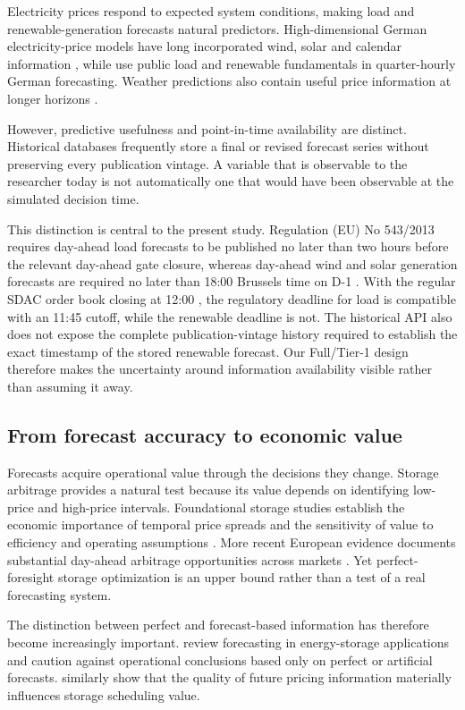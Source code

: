 Electricity prices respond to expected system conditions, making load and renewable-generation forecasts natural predictors. High-dimensional German electricity-price models have long incorporated wind, solar and calendar information \citep{ziel2015}, while \citet{kathziel2018} use public load and renewable fundamentals in quarter-hourly German forecasting. Weather predictions also contain useful price information at longer horizons \citep{sgarlato2023}.

However, predictive usefulness and point-in-time availability are distinct. Historical databases frequently store a final or revised forecast series without preserving every publication vintage. A variable that is observable to the researcher today is not automatically one that would have been observable at the simulated decision time.

This distinction is central to the present study. Regulation (EU) No 543/2013 requires day-ahead load forecasts to be published no later than two hours before the relevant day-ahead gate closure, whereas day-ahead wind and solar generation forecasts are required no later than 18:00 Brussels time on D-1 \citep{eureg543}. With the regular SDAC order book closing at 12:00 \citep{epex2025}, the regulatory deadline for load is compatible with an 11:45 cutoff, while the renewable deadline is not. The historical API also does not expose the complete publication-vintage history required to establish the exact timestamp of the stored renewable forecast. Our Full/Tier-1 design therefore makes the uncertainty around information availability visible rather than assuming it away.

\subsection{From forecast accuracy to economic value}

Forecasts acquire operational value through the decisions they change. Storage arbitrage provides a natural test because its value depends on identifying low-price and high-price intervals. Foundational storage studies establish the economic importance of temporal price spreads and the sensitivity of value to efficiency and operating assumptions \citep{sioshansi2009}. More recent European evidence documents substantial day-ahead arbitrage opportunities across markets \citep{mercier2023}. Yet perfect-foresight storage optimization is an upper bound rather than a test of a real forecasting system.

The distinction between perfect and forecast-based information has therefore become increasingly important. \citet{sharma2021} review forecasting in energy-storage applications and caution against operational conclusions based only on perfect or artificial forecasts. \citet{prakash2025} similarly show that the quality of future pricing information materially influences storage scheduling value.

